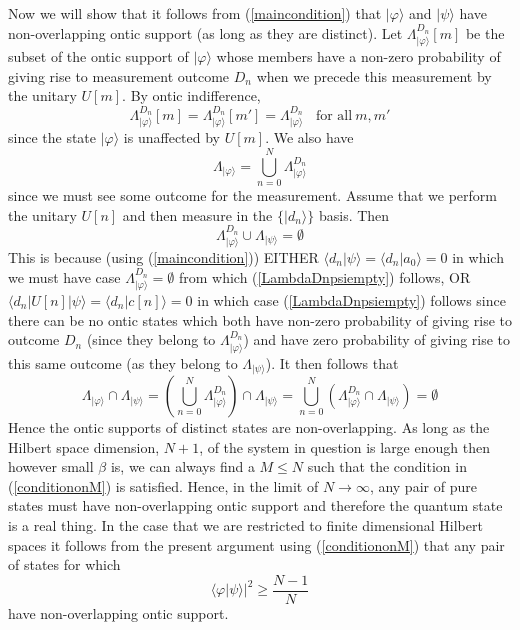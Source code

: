 \documentclass[12pt]{article}
\begin{document}
Now we will show that it follows from (\ref{maincondition}) that $|\varphi\rangle$ and $|\psi\rangle$ have non-overlapping ontic support (as long as they are distinct).  Let
$\Lambda_{|\varphi\rangle}^{D_n}[m]$ be the subset of the ontic support of $|\varphi\rangle$ whose members have a non-zero probability of giving rise to measurement outcome $D_n$ when we
precede this measurement by the unitary $U[m]$.  By ontic indifference, \begin{equation} \Lambda_{|\varphi\rangle}^{D_n}[m] = \Lambda_{|\varphi\rangle}^{D_n}[m'] =
\Lambda_{|\varphi\rangle}^{D_n}  ~~~~ \text{for all}~m, m' \end{equation} since the state $|\varphi\rangle$ is unaffected by $U[m]$. We also have \begin{equation} \Lambda_{|\varphi\rangle} =
\bigcup_{n=0}^N \Lambda_{|\varphi\rangle}^{D_n} \end{equation} since we must see some outcome for the measurement. Assume that we perform the unitary $U[n]$ and then measure in the
$\{|d_n\rangle\}$ basis. Then \begin{equation}\label{LambdaDnpsiempty}
 \Lambda_{|\varphi\rangle}^{D_n} \cup \Lambda_{|\psi\rangle} = \emptyset
\end{equation} This is because (using (\ref{maincondition})) EITHER $\langle d_n|\psi\rangle=\langle d_n|a_0\rangle=0$ in which we must have case $\Lambda_{|\varphi\rangle}^{D_n}=\emptyset$
from which (\ref{LambdaDnpsiempty}) follows, OR  $\langle d_n| U[n]| \psi\rangle = \langle d_n |c[n] \rangle = 0$ in which case (\ref{LambdaDnpsiempty}) follows since there can be no ontic
states which both have non-zero probability of giving rise to outcome $D_n$ (since they belong to $\Lambda_{|\varphi\rangle}^{D_n}$) and have zero probability of giving rise to this same
outcome (as they belong to $\Lambda_{|\psi\rangle}$).  It then follows that \begin{equation}
 \Lambda_{|\varphi\rangle} \cap \Lambda_{|\psi\rangle} = \left( \bigcup_{n=0}^N \Lambda_{|\varphi\rangle}^{D_n} \right) \cap  \Lambda_{|\psi\rangle}
 =  \bigcup_{n=0}^N \left( \Lambda_{|\varphi\rangle}^{D_n} \cap  \Lambda_{|\psi\rangle} \right) = \emptyset
\end{equation} Hence the ontic supports of distinct states are non-overlapping.  As long as the Hilbert space dimension, $N+1$, of the system in question is large enough then however small
$\beta$ is, we can always find a $M\leq N$ such that the condition in (\ref{conditiononM}) is satisfied.  Hence, in the limit of $N\rightarrow \infty$, any pair of pure states must have
non-overlapping ontic support and therefore the quantum state is a real thing.  In the case that we are restricted to finite dimensional Hilbert spaces it follows from the present argument
using (\ref{conditiononM}) that any pair of states for which \begin{equation} \langle \varphi| \psi\rangle|^2 \geq \frac{N-1}{N} \end{equation} have non-overlapping ontic support.
\end{document}
